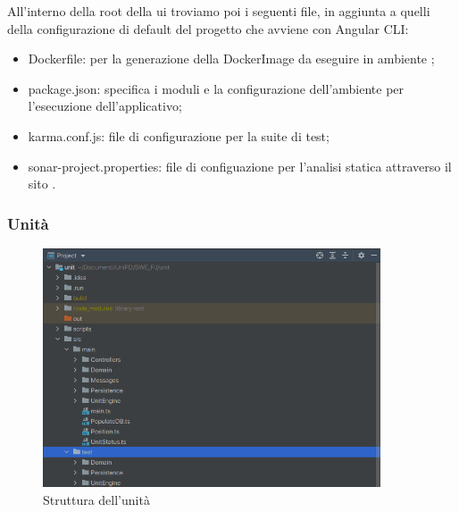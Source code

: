 	All'interno della root della ui troviamo poi i seguenti file, in aggiunta a quelli della configurazione di default del progetto che avviene con Angular CLI:
	\begin{itemize}
		\item{Dockerfile}: per la generazione della DockerImage da eseguire in ambiente ;
		\item{package.json}: specifica i moduli e la configurazione dell'ambiente  per l'esecuzione dell'applicativo;
		\item{karma.conf.js}: file di configurazione per la suite di test;
		\item{sonar-project.properties}: file di configuazione per l'analisi statica attraverso il sito	.
	\end{itemize}

\newpage

	\subsubsection{Unità}
	
	\begin{figure}[H]
		\centering
		\includegraphics[width=10cm]{img/struttura_unita.png}
		\caption{Struttura dell'unità}
	\end{figure}

